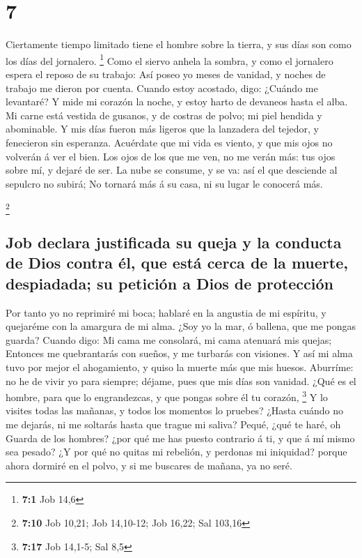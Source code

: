 \hypertarget{section-6}{%
\section{7}\label{section-6}}

 Ciertamente tiempo limitado tiene el hombre sobre la
tierra, y sus días son como los días del jornalero. \footnote{\textbf{7:1}
  Job 14,6}  Como el siervo anhela la sombra, y como el
jornalero espera el reposo de su trabajo:  Así poseo yo
meses de vanidad, y noches de trabajo me dieron por cuenta. 
Cuando estoy acostado, digo: ¿Cuándo me levantaré? Y mide mi corazón la
noche, y estoy harto de devaneos hasta el alba.  Mi carne
está vestida de gusanos, y de costras de polvo; mi piel hendida y
abominable.  Y mis días fueron más ligeros que la lanzadera
del tejedor, y fenecieron sin esperanza.  Acuérdate que mi
vida es viento, y que mis ojos no volverán á ver el bien. 
Los ojos de los que me ven, no me verán más: tus ojos sobre mí, y dejaré
de ser.  La nube se consume, y se va: así el que desciende
al sepulcro no subirá;  No tornará más á su casa, ni su
lugar le conocerá más.

\footnote{\textbf{7:10} Job 10,21; Job 14,10-12; Job 16,22; Sal 103,16}

\hypertarget{job-declara-justificada-su-queja-y-la-conducta-de-dios-contra-uxe9l-que-estuxe1-cerca-de-la-muerte-despiadada-su-peticiuxf3n-a-dios-de-protecciuxf3n}{%
\subsection{Job declara justificada su queja y la conducta de Dios
contra él, que está cerca de la muerte, despiadada; su petición a Dios
de
protección}\label{job-declara-justificada-su-queja-y-la-conducta-de-dios-contra-uxe9l-que-estuxe1-cerca-de-la-muerte-despiadada-su-peticiuxf3n-a-dios-de-protecciuxf3n}}

 Por tanto yo no reprimiré mi boca; hablaré en la angustia
de mi espíritu, y quejaréme con la amargura de mi alma. 
¿Soy yo la mar, ó ballena, que me pongas guarda?  Cuando
digo: Mi cama me consolará, mi cama atenuará mis quejas; 
Entonces me quebrantarás con sueños, y me turbarás con visiones.
 Y así mi alma tuvo por mejor el ahogamiento, y quiso la
muerte más que mis huesos.  Aburríme: no he de vivir yo
para siempre; déjame, pues que mis días son vanidad.  ¿Qué
es el hombre, para que lo engrandezcas, y que pongas sobre él tu
corazón, \footnote{\textbf{7:17} Job 14,1-5; Sal 8,5}  Y lo
visites todas las mañanas, y todos los momentos lo pruebes?
 ¿Hasta cuándo no me dejarás, ni me soltarás hasta que
trague mi saliva?  Pequé, ¿qué te haré, oh Guarda de los
hombres? ¿por qué me has puesto contrario á ti, y que á mí mismo sea
pesado?  ¿Y por qué no quitas mi rebelión, y perdonas mi
iniquidad? porque ahora dormiré en el polvo, y si me buscares de mañana,
ya no seré.

